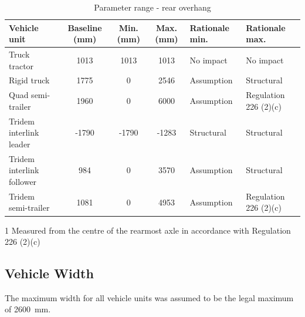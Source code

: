 \begin{table}[H]
	\centering\footnotesize
	\begin{threeparttable}

		\begin{tabulary}{\textwidth}{lcccll}
			\toprule
			\textbf{Vehicle unit} & \textbf{Baseline (mm)} & \textbf{Min. (mm)} & \textbf{Max. (mm)} & \textbf{Rationale min.} & \textbf{Rationale max.} \\
			\midrule
            Truck tractor & 1013  & 1013  & 1013  & No impact & No impact \\
            Rigid truck & 1775  & 0     & 2546  & Assumption & Structural \\
            Quad semi-trailer & 1960  & 0     & 6000  & Assumption & Regulation 226 (2)(c) \\
            Tridem interlink leader & -1790 & -1790 & -1283 & Structural & Structural \\
            Tridem interlink follower & 984   & 0     & 3570  & Assumption & Structural \\
            Tridem semi-trailer & 1081  & 0     & 4953  & Assumption & Regulation 226 (2)(c) \\
			\bottomrule
		\end{tabulary}

		\caption{Parameter range - rear overhang }
		\label{table:parameter-range-rear-overhang}

		\begin{tablenotes}
			\item[1] Measured from the centre of the rearmost axle in accordance with Regulation 226 (2)(c)
		\end{tablenotes}

	\end{threeparttable}
\end{table}

\subsection{Vehicle Width}\label{section:pr-vehicle-width}

The maximum width for all vehicle units was assumed to be the legal maximum of 2600~mm.


